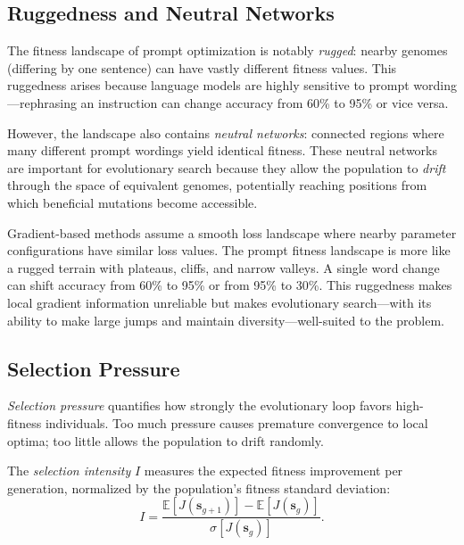 \subsection{Ruggedness and Neutral Networks}

The fitness landscape of prompt optimization is notably \emph{rugged}: nearby genomes (differing by one sentence) can have vastly different fitness values. This ruggedness arises because language models are highly sensitive to prompt wording---rephrasing an instruction can change accuracy from 60\% to 95\% or vice versa.

However, the landscape also contains \emph{neutral networks}: connected regions where many different prompt wordings yield identical fitness. These neutral networks are important for evolutionary search because they allow the population to \emph{drift} through the space of equivalent genomes, potentially reaching positions from which beneficial mutations become accessible.

\begin{keyinsight}
Gradient-based methods assume a smooth loss landscape where nearby parameter configurations have similar loss values. The prompt fitness landscape is more like a rugged terrain with plateaus, cliffs, and narrow valleys. A single word change can shift accuracy from 60\% to 95\% or from 95\% to 30\%. This ruggedness makes local gradient information unreliable but makes evolutionary search---with its ability to make large jumps and maintain diversity---well-suited to the problem.
\end{keyinsight}

\subsection{Selection Pressure}

\emph{Selection pressure} quantifies how strongly the evolutionary loop favors high-fitness individuals. Too much pressure causes premature convergence to local optima; too little allows the population to drift randomly.

\begin{definition}
The \emph{selection intensity} $I$ measures the expected fitness improvement per generation, normalized by the population's fitness standard deviation:
\begin{equation}
I = \frac{\mathbb{E}[J(\mathbf{s}_{g+1})] - \mathbb{E}[J(\mathbf{s}_g)]}{\sigma[J(\mathbf{s}_g)]}.
\end{equation}
\end{definition}

